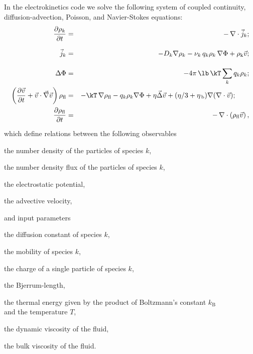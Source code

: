 In the electrokinetics code we solve the following system of coupled continuity,
diffusion-advection, Poisson, and Navier-Stokes equations:
\begin{eqnarray}
\label{eq:ek-model-continuity} \frac{\partial \rho_k}{\partial t} & = & -\, \nabla \cdot \vec{j}_k \vphantom{\left(\frac{\partial}{\partial}\right)}; \\
\label{eq:ek-model-fluxes} \vec{j}_{k} & = & -D_k \nabla \rho_k - \nu_k \, q_k \rho_k\, \nabla \Phi + \rho_\mathrm{k} \vec{v} \vphantom{\left(\frac{\partial}{\partial}\right)}; \\
\label{eq:ek-model-poisson} \Delta \Phi & = & -4 \pi \, \lb \, \kT \sum_k q_k \rho_k \vphantom{\left(\frac{\partial}{\partial}\right)}; \\
\label{eq:ek-model-velocity} \left(\frac{\partial \vec{v}}{\partial t} + \vec{v} \cdot \vec{\nabla} \vec{v} \right) \rho_\text{fl} & = & -\kT \, \nabla \rho_\text{fl} - q_k \rho_k \nabla \Phi + \eta \vec{\Delta} \vec{v} + (\eta / 3 + \eta_{\text{\,b}}) \nabla (\nabla \cdot \vec{v}); \qquad \\
\label{eq:ek-model-continuity-fl} \frac{\partial \rho_\text{fl}}{\partial t} & = & -\,\nabla\cdot\left( \rho_\text{fl} \vec{v} \right) \vphantom{\left(\frac{\partial}{\partial}\right)}, 
\end{eqnarray}
which define relations between the following observables
\begin{description}[itemsep=0cm,labelindent=1.5em,leftmargin=4.5em,style=nextline]
  \item[$\rho_k$] the number density of the particles of species $k$,
  \item[$\vec{j}_k$] the number density flux of the particles of species $k$,
  \item[$\Phi$] the electrostatic potential,
  \item[$\vec{v}$] the advective velocity,
\end{description}
and input parameters
\begin{description}[itemsep=0cm,labelindent=1.5em,leftmargin=4.5em,style=nextline]
  \item[$D_k$] the diffusion constant of species $k$,
  \item[$\nu_k$] the mobility of species $k$,
  \item[$q_k$] the charge of a single particle of species $k$,
  \item[$\lb$] the Bjerrum-length,
  \item[$\kT$] the thermal energy given by the product of Boltzmann's constant
  $k_\text{B}$\\and the temperature $T$,
  \item[$\eta$] the dynamic viscosity of the fluid,
  \item[$\eta_{\text{\,b}}$] the bulk viscosity of the fluid.
\end{description}
